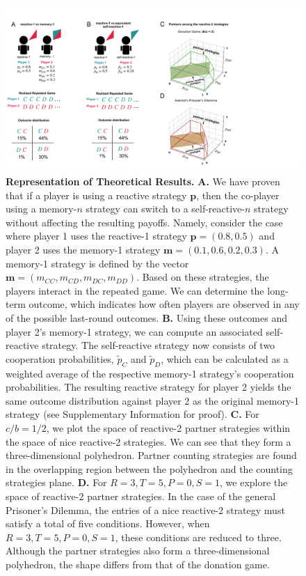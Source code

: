 \documentclass{article}
\theoremstyle{definition}
\begin{document}
\begin{figure}[htbp!]
  \centering
  \includegraphics[width=\textwidth]{figures/conceptual_figure_results.pdf}
  \caption{\textbf{Representation of Theoretical Results.} \textbf{A.} We have
proven that if a player is using a reactive strategy $\mathbf{p}$, then the
co-player using a memory-$n$ strategy can switch to a self-reactive-$n$ strategy
without affecting the resulting payoffs. Namely, consider the case where player
1 uses the reactive-1 strategy $\mathbf{p} = (0.8, 0.5)$ and player 2 uses the
memory-1 strategy $\mathbf{m} = (0.1, 0.6, 0.2, 0.3)$. A memory-1 strategy is
defined by the vector $\mathbf{m} = (m_{CC}, m_{CD}, m_{DC}, m_{DD})$. Based on
these strategies, the players interact in the repeated game. We can determine
the long-term outcome, which indicates how often players are observed in any of
the possible last-round outcomes.
\textbf{B.} Using
these outcomes and player 2's memory-1 strategy, we can compute an associated
self-reactive strategy. The self-reactive strategy now consists of two
cooperation probabilities, $\tilde{p}_C$ and $\tilde{p}_D$, which can be
calculated as a weighted average of the respective memory-1 strategy's
cooperation probabilities. The resulting reactive strategy for player 2 yields
the same outcome distribution against player 2 as the original memory-1 strategy
(see Supplementary Information for proof). \textbf{C.} For $c/b = 1/2$, we plot the space of
reactive-2 partner strategies within the space of nice reactive-2 strategies. We
can see that they form a three-dimensional polyhedron. Partner counting strategies
are found in the overlapping region between the polyhedron and the counting
strategies plane.
\textbf{D.} For $R=3, T=5, P=0, S=1$, we explore the space of reactive-2 partner
strategies. In the case of the general Prisoner's Dilemma, the entries of a
nice reactive-2 strategy must satisfy a total of five conditions. However,
when $R=3, T=5, P=0, S=1$, these conditions are reduced to three. Although the
partner strategies also form a three-dimensional polyhedron, the shape differs
from that of the donation game.}\label{fig:conceptual_figure_results}
\end{figure}
\end{document}
